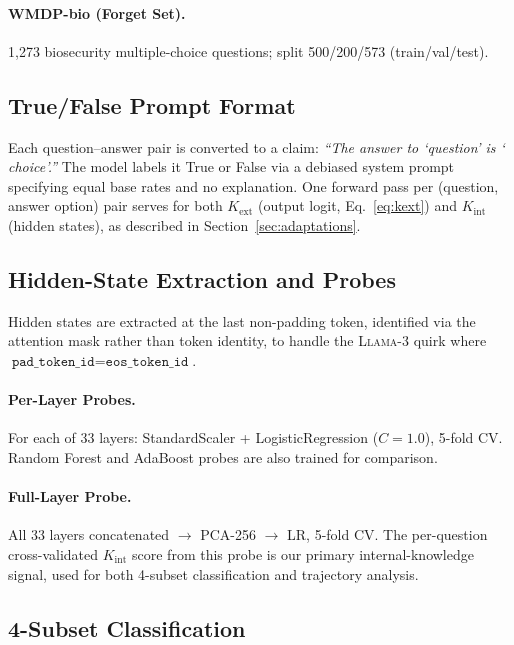 \documentclass[11pt]{article}
\begin{document}
\paragraph{WMDP-bio (Forget Set).}
1,273 biosecurity multiple-choice questions; split 500/200/573 (train/val/test).

\subsection{True/False Prompt Format}
\label{sec:tf-format}

Each question--answer pair is converted to a claim:
\textit{``The answer to `\textlangle question\textrangle' is `\textlangle
choice\textrangle'.''}
The model labels it True or False via a debiased system prompt specifying equal
base rates and no explanation.
One forward pass per (question, answer option) pair serves for both $K_\text{ext}$
(output logit, Eq.~\ref{eq:kext}) and $K_\text{int}$ (hidden states), as
described in Section~\ref{sec:adaptations}.

\subsection{Hidden-State Extraction and Probes}
\label{sec:hs-extract}

Hidden states are extracted at the last non-padding token, identified via the
attention mask rather than token identity, to handle the \textsc{Llama-3} quirk
where $\texttt{pad\_token\_id} = \texttt{eos\_token\_id}$.

\paragraph{Per-Layer Probes.}
For each of 33 layers: StandardScaler + LogisticRegression ($C=1.0$), 5-fold CV.
Random Forest and AdaBoost probes are also trained for comparison.

\paragraph{Full-Layer Probe.}
All 33 layers concatenated $\to$ PCA-256 $\to$ LR, 5-fold CV.
The per-question cross-validated $K_\text{int}$ score from this probe is our
primary internal-knowledge signal, used for both 4-subset classification and
trajectory analysis.

\subsection{4-Subset Classification}
\label{sec:subsets-def}
\end{document}
